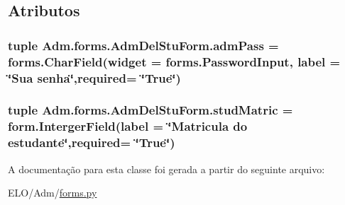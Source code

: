 \subsection{Atributos}
\hypertarget{classAdm_1_1forms_1_1AdmDelStuForm_aff2b1076da947f2f4415f985bdc46d18}{
\subsubsection[{adm\-Pass}]{\setlength{\rightskip}{0pt plus 5cm}tuple Adm.\-forms.\-Adm\-Del\-Stu\-Form.\-adm\-Pass = forms.\-Char\-Field(widget = forms.\-Password\-Input, label = \char`\"{}Sua senha\char`\"{},required= \char`\"{}True\char`\"{})\hspace{0.3cm}{\ttfamily [static]}}}\label{classAdm_1_1forms_1_1AdmDelStuForm_aff2b1076da947f2f4415f985bdc46d18}
\hypertarget{classAdm_1_1forms_1_1AdmDelStuForm_a9ab40744579cf679da8a3a922a29061c}{
\subsubsection[{stud\-Matric}]{\setlength{\rightskip}{0pt plus 5cm}tuple Adm.\-forms.\-Adm\-Del\-Stu\-Form.\-stud\-Matric = form.\-Interger\-Field(label = \char`\"{}Matricula do estudante\char`\"{},required= \char`\"{}True\char`\"{})\hspace{0.3cm}{\ttfamily [static]}}}\label{classAdm_1_1forms_1_1AdmDelStuForm_a9ab40744579cf679da8a3a922a29061c}


A documentação para esta classe foi gerada a partir do seguinte arquivo\-:\begin{DoxyCompactItemize}
\item 
E\-L\-O/\-Adm/\hyperlink{Adm_2forms_8py}{forms.\-py}\end{DoxyCompactItemize}

